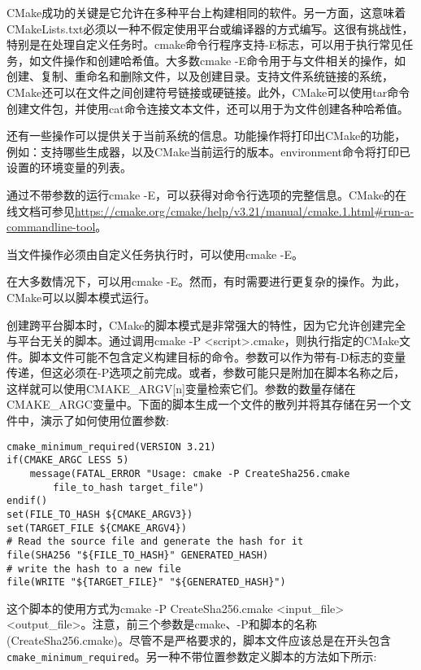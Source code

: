 
CMake成功的关键是它允许在多种平台上构建相同的软件。另一方面，这意味着CMakeLists.txt必须以一种不假定使用平台或编译器的方式编写。这很有挑战性，特别是在处理自定义任务时。cmake命令行程序支持-E标志，可以用于执行常见任务，如文件操作和创建哈希值。大多数cmake -E命令用于与文件相关的操作，如创建、复制、重命名和删除文件，以及创建目录。支持文件系统链接的系统，CMake还可以在文件之间创建符号链接或硬链接。此外，CMake可以使用tar命令创建文件包，并使用cat命令连接文本文件，还可以用于为文件创建各种哈希值。

还有一些操作可以提供关于当前系统的信息。功能操作将打印出CMake的功能，例如：支持哪些生成器，以及CMake当前运行的版本。environment命令将打印已设置的环境变量的列表。

通过不带参数的运行cmake -E，可以获得对命令行选项的完整信息。CMake的在线文档可参见\url{https://cmake.org/cmake/help/v3.21/manual/cmake.1.html#run-a-commandline-tool}。

\begin{tcolorbox}[colback=blue!5!white,colframe=blue!75!black,title=平台无关的文件操作]
当文件操作必须由自定义任务执行时，可以使用cmake -E。
\end{tcolorbox}

在大多数情况下，可以用cmake -E。然而，有时需要进行更复杂的操作。为此，CMake可以以脚本模式运行。


创建跨平台脚本时，CMake的脚本模式是非常强大的特性，因为它允许创建完全与平台无关的脚本。通过调用cmake -P <script>.cmake，则执行指定的CMake文件。脚本文件可能不包含定义构建目标的命令。参数可以作为带有-D标志的变量传递，但这必须在-P选项之前完成。或者，参数可能只是附加在脚本名称之后，这样就可以使用CMAKE\_ARGV[n]变量检索它们。参数的数量存储在CMAKE\_ARGC变量中。下面的脚本生成一个文件的散列并将其存储在另一个文件中，演示了如何使用位置参数:

\begin{lstlisting}[style=styleCMake]
cmake_minimum_required(VERSION 3.21)
if(CMAKE_ARGC LESS 5)
	message(FATAL_ERROR "Usage: cmake -P CreateSha256.cmake
		file_to_hash target_file")
endif()
set(FILE_TO_HASH ${CMAKE_ARGV3})
set(TARGET_FILE ${CMAKE_ARGV4})
# Read the source file and generate the hash for it
file(SHA256 "${FILE_TO_HASH}" GENERATED_HASH)
# write the hash to a new file
file(WRITE "${TARGET_FILE}" "${GENERATED_HASH}")
\end{lstlisting}

这个脚本的使用方式为cmake -P CreateSha256.cmake <input\_file> <output\_file>。注意，前三个参数是cmake、-P和脚本的名称(CreateSha256.cmake)。尽管不是严格要求的，脚本文件应该总是在开头包含\texttt{cmake\_minimum\_required}。另一种不带位置参数定义脚本的方法如下所示:

